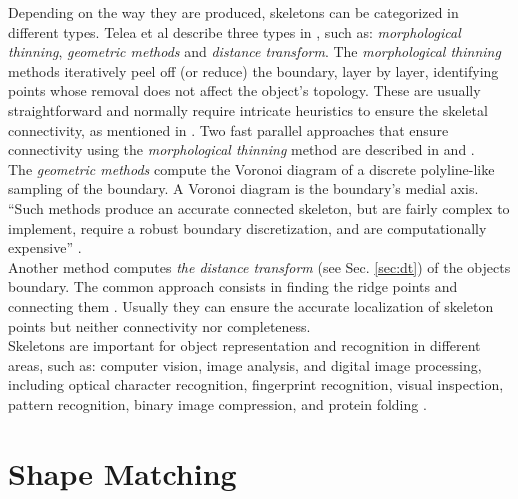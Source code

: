 Depending on the way they are produced, skeletons can be categorized in different types.
Telea et al describe three types in \cite{augmented}, such as: \emph{morphological thinning},
\emph{geometric methods} and \emph{distance transform}. The \emph{morphological thinning} methods iteratively peel off (or reduce) the boundary, layer by layer, identifying
points whose removal does not affect the object's topology. These are usually 
straightforward and normally require intricate heuristics to ensure the skeletal
connectivity, as mentioned in \cite{augmented}. Two fast parallel approaches that
ensure connectivity using the \emph{morphological thinning} method are described
in \cite{onepass} and \cite{thinning}.\\
The \emph{geometric methods} compute the Voronoi diagram of a discrete polyline-like
sampling of the boundary. A Voronoi diagram is the boundary's medial axis. ``Such 
methods produce an accurate connected skeleton, but are fairly complex to implement,
require a robust boundary discretization, and are computationally expensive''
\cite[p.251]{augmented}.\\
Another method computes \emph{the distance transform}
(see Sec. \ref{sec:dt}) of the objects boundary. The common approach consists in
finding the ridge points and connecting them \cite{maxima,euclideancentre,ridgedt}.
 Usually they can ensure the accurate localization of skeleton points 
but neither connectivity nor completeness.\\

Skeletons are important for object representation and recognition in different areas,
such as: computer vision, image analysis, and digital image processing, 
including optical character recognition, fingerprint recognition, visual inspection,
pattern recognition, binary image compression, and protein folding \cite{skprotein}.


\section{Shape Matching}
\label{sec:shapefitting}

